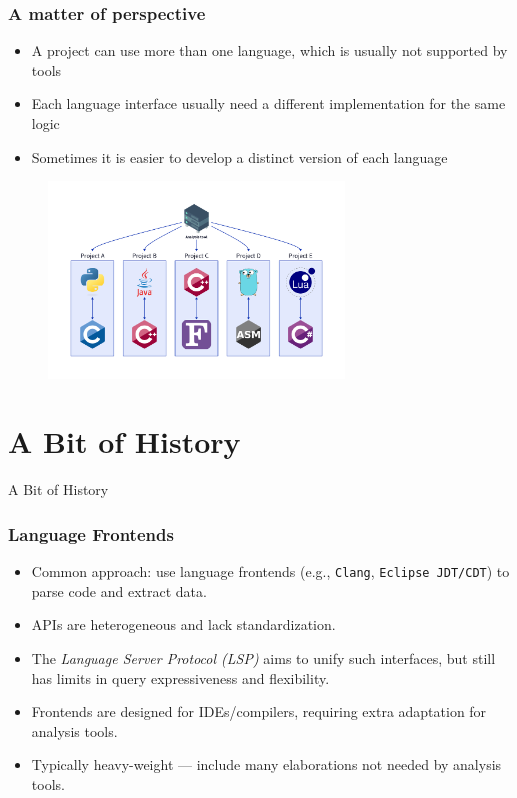 \documentclass[dvipsnames, 10pt, table]{beamer}
\begin{document}
\begin{frame}
  \frametitle{A matter of perspective}
  \begin{itemize}
    \item A project can use more than one language, which is usually not supported by tools
    \item Each language interface usually need a different implementation for the same logic
    \item Sometimes it is easier to develop a distinct version of each language
  \end{itemize}
  \begin{figure}
    \begin{center}
      \includegraphics[width=0.7\textwidth]{figures/githut/problem-multi-languages.png}
    \end{center}
  \end{figure}
\end{frame}

\section{A Bit of History}
\begin{frame}
  \centering
  \Huge
  A Bit of History
\end{frame}

\begin{frame}
  \frametitle{Language Frontends}
  \begin{itemize}
    \item Common approach: use language frontends (e.g., \texttt{Clang}, \texttt{Eclipse JDT/CDT}) to parse code and extract data.
    \item APIs are heterogeneous and lack standardization.
    \item The \textit{Language Server Protocol (LSP)} aims to unify such interfaces, but still has limits in query expressiveness and flexibility.
    \item Frontends are designed for IDEs/compilers, requiring extra adaptation for analysis tools.
    \item Typically heavy-weight — include many elaborations not needed by analysis tools.
  \end{itemize}
\end{frame}
\end{document}
